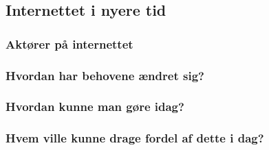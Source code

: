 \subsection{Internettet i nyere tid}

\subsubsection{Aktører på internettet}

\subsubsection{Hvordan har behovene ændret sig?}

\subsubsection{Hvordan kunne man gøre idag?}

\subsubsection{Hvem ville kunne drage fordel af dette i dag?}
